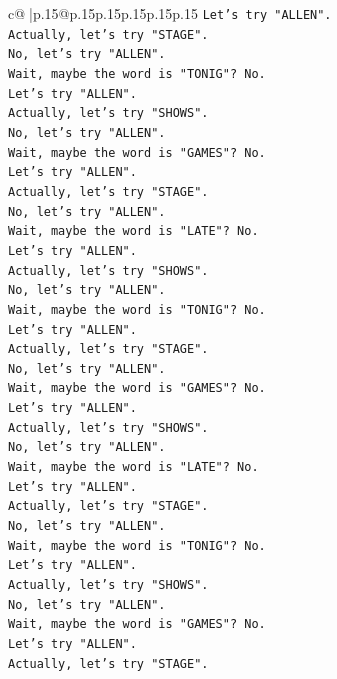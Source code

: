 \documentclass{article}
\begin{document}
{\begin{supertabular}{c@{$\;$}|p{.15\linewidth}@{}p{.15\linewidth}p{.15\linewidth}p{.15\linewidth}p{.15\linewidth}p{.15\linewidth}}
{{{\texttt{Let's try "ALLEN".} \\
\texttt{Actually, let's try "STAGE".} \\
\texttt{No, let's try "ALLEN".} \\
\texttt{Wait, maybe the word is "TONIG"? No.} \\
\texttt{Let's try "ALLEN".} \\
\texttt{Actually, let's try "SHOWS".} \\
\texttt{No, let's try "ALLEN".} \\
\texttt{Wait, maybe the word is "GAMES"? No.} \\
\texttt{Let's try "ALLEN".} \\
\texttt{Actually, let's try "STAGE".} \\
\texttt{No, let's try "ALLEN".} \\
\texttt{Wait, maybe the word is "LATE"? No.} \\
\texttt{Let's try "ALLEN".} \\
\texttt{Actually, let's try "SHOWS".} \\
\texttt{No, let's try "ALLEN".} \\
\texttt{Wait, maybe the word is "TONIG"? No.} \\
\texttt{Let's try "ALLEN".} \\
\texttt{Actually, let's try "STAGE".} \\
\texttt{No, let's try "ALLEN".} \\
\texttt{Wait, maybe the word is "GAMES"? No.} \\
\texttt{Let's try "ALLEN".} \\
\texttt{Actually, let's try "SHOWS".} \\
\texttt{No, let's try "ALLEN".} \\
\texttt{Wait, maybe the word is "LATE"? No.} \\
\texttt{Let's try "ALLEN".} \\
\texttt{Actually, let's try "STAGE".} \\
\texttt{No, let's try "ALLEN".} \\
\texttt{Wait, maybe the word is "TONIG"? No.} \\
\texttt{Let's try "ALLEN".} \\
\texttt{Actually, let's try "SHOWS".} \\
\texttt{No, let's try "ALLEN".} \\
\texttt{Wait, maybe the word is "GAMES"? No.} \\
\texttt{Let's try "ALLEN".} \\
\texttt{Actually, let's try "STAGE".} \\
}}}
\end{supertabular}}
\end{document}
